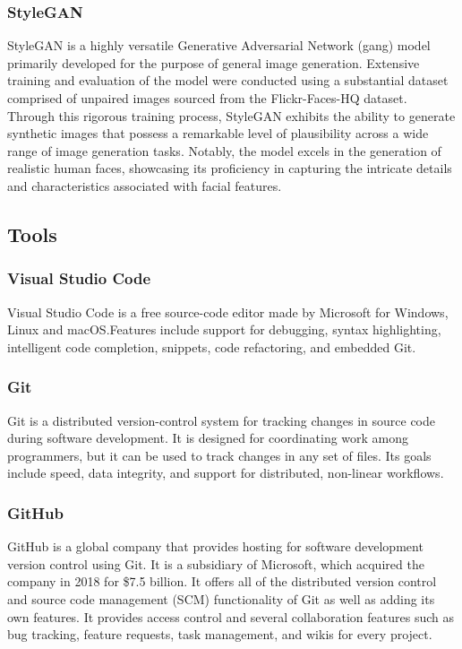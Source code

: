 \subsubsection{StyleGAN}\label{subsubsec:stylegan}
StyleGAN is a highly versatile Generative Adversarial Network (\gls{gang}) model primarily developed for the purpose of general image generation. 
Extensive training and evaluation of the model were conducted using a substantial dataset comprised of unpaired images sourced from the Flickr-Faces-HQ dataset. Through this rigorous training process, StyleGAN exhibits the ability to generate synthetic images that possess a remarkable level of plausibility across a wide range of image generation tasks. 
Notably, the model excels in the generation of realistic human faces, showcasing its proficiency in capturing the intricate details and characteristics associated with facial features.

\subsection{Tools}\label{subsec:tools}
\subsubsection*{Visual Studio Code}\label{subsubsec:vscode}
Visual Studio Code is a free source-code editor made by Microsoft for Windows,
Linux and macOS.\@ Features include support for debugging, syntax highlighting,
intelligent code completion, snippets, code refactoring, and embedded Git.
\subsubsection{Git}\label{subsubsec:git}
Git is a distributed version-control system for tracking changes in source code
during software development. It is designed for coordinating work among
programmers, but it can be used to track changes in any set of files. Its goals
include speed, data integrity, and support for distributed, non-linear
workflows.
\subsubsection{GitHub}\label{subsubsec:github}
GitHub is a global company that provides hosting for software development
version control using Git. It is a subsidiary of Microsoft, which acquired the
company in 2018 for \$7.5 billion. It offers all of the distributed version
control and source code management (SCM) functionality of Git as well as adding
its own features. It provides access control and several collaboration features
such as bug tracking, feature requests, task management, and wikis for every
project.
